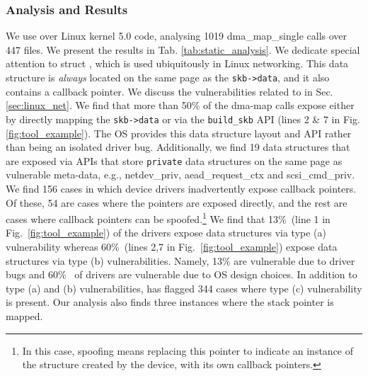 \subsubsection{Analysis and Results}
We use \tool over Linux kernel 5.0 code,
analysing 1019 dma\_map\_single calls over 447 files. We present the results in Tab. \ref{tab:static_analysis}. We dedicate special attention to struct \shinfo, which is used ubiquitously in Linux networking. This data structure is \textit{always} located on the same page as the \texttt{skb->data}, and it also contains a callback pointer. We discuss the vulnerabilities related to \shinfo in Sec. \ref{sec:linux_net}. We find that more than 50\% of the dma-map calls expose \shinfo either by directly mapping the \texttt{skb->data} or via the \texttt{build\_skb} API (lines 2 \& 7 in Fig. \ref{fig:tool_example}). The OS provides this data structure layout and API rather than being an isolated driver bug. Additionally, we find 19 data structures that are exposed via APIs that store \texttt{private} data structures on the same page as vulnerable meta-data, e.g., netdev\_priv, aead\_request\_ctx and scsi\_cmd\_priv. We find 156 cases in which device drivers inadvertently expose callback pointers. Of these, 54 are cases where the pointers are exposed directly, and the rest are cases where callback pointers can be spoofed.\footnote{In this case, spoofing means replacing this pointer to indicate an instance of the structure created by the device, with its own callback pointers.}
We find that 13\%~(line 1 in Fig.~\ref{fig:tool_example}) of the drivers expose data structures via type (a) vulnerability whereas 60\%~(lines 2,7 in Fig.~\ref{fig:tool_example}) expose data structures via type (b) vulnerabilities. Namely, 13\% are vulnerable due to driver bugs and 60\%~ of drivers are vulnerable due to OS design choices. 
In addition to type (a) and (b) vulnerabilities, \tool has flagged 344 cases where type (c) vulnerability is present.
Our analysis also finds three instances where the stack pointer is mapped.

